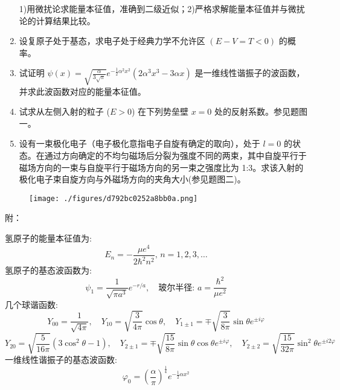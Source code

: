\begin{enumerate}
    1)用微扰论求能量本征值，准确到二级近似；2)严格求解能量本征值并与微扰论的计算结果比较。\\
    \item 设复原子处于基态，求电子处于经典力学不允许区 $(E - V = T < 0)$ 的概率。
    \item 试证明 $\psi(x) = \sqrt{\frac{\alpha}{3\sqrt{\pi}}} e^{-\frac{1}{2}\alpha^2 x^2} (2\alpha^3 x^3 - 3\alpha x)$ 是一维线性谐振子的波函数，并求此波函数对应的能量本征值。
    \item 试求从左侧入射的粒子 ($E > 0$) 在下列势垒壁 $x = 0$ 处的反射系数。参见题图一。
    \item 设有一束极化电子（电子极化意指电子自旋有确定的取向），处于 $l = 0$ 的状态。在通过方向确定的不均匀磁场后分裂为强度不同的两束，其中自旋平行于磁场方向的一束与自旋平行于磁场方向的另一束之强度比为 1:3。求该入射的极化电子束自旋方向与外磁场方向的夹角大小(参见题图二)。
\end{enumerate}
\begin{figure}[ht]
\centering
\texttt{[image: ./figures/d792bc0252a8bb0a.png]}
\caption{} \label{fig_NJUST4_1}
\end{figure}
附：

氢原子的能量本征值为:
\[E_n = -\frac{\mu e^4}{2\hbar^2 n^2}, \, n=1,2,3,\ldots~\]
氢原子的基态波函数为:\[\psi_1 = \frac{1}{\sqrt{\pi a^3}} e^{-r/a}, \quad \text{玻尔半径: } a = \frac{\hbar^2}{\mu e^2}~\]
几个球谐函数:\[Y_{00} = \frac{1}{\sqrt{4\pi}}, \quad Y_{10} = \sqrt{\frac{3}{4\pi}} \cos \theta, \quad Y_{1\pm1} = \mp \sqrt{\frac{3}{8\pi}} \sin \theta e^{\pm i\varphi}~\]
\[Y_{20} = \sqrt{\frac{5}{16\pi}} (3\cos^2 \theta - 1), \quad Y_{2\pm1} = \mp \sqrt{\frac{15}{8\pi}} \sin \theta \cos \theta e^{\pm i\varphi}, \quad Y_{2\pm2} = \sqrt{\frac{15}{32\pi}} \sin^2 \theta e^{\pm i 2\varphi}~\]
一维线性谐振子的基态波函数:\[\varphi_0 = \left(\frac{\alpha}{\pi}\right)^{\frac{1}{4}} e^{-\frac{1}{2} \alpha x^2}~\]